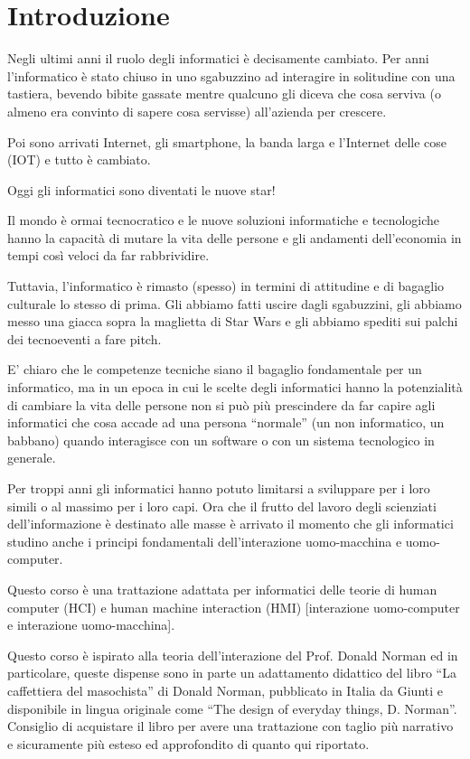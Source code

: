 \chapter{Introduzione}

Negli ultimi anni il ruolo degli informatici è decisamente cambiato. Per anni l'informatico è stato chiuso in uno sgabuzzino ad interagire in solitudine con una tastiera, bevendo bibite gassate mentre qualcuno gli diceva che cosa serviva (o almeno era convinto di sapere cosa servisse) all'azienda per crescere.

Poi sono arrivati Internet, gli smartphone, la banda larga e l'Internet delle cose (IOT) e tutto è cambiato. 

Oggi gli informatici sono diventati le nuove star! 

Il mondo è ormai tecnocratico e le nuove soluzioni informatiche e tecnologiche hanno la capacità di mutare la vita delle persone e gli andamenti dell'economia in tempi così veloci da far rabbrividire.

Tuttavia, l'informatico è rimasto (spesso) in termini di attitudine e di bagaglio culturale lo stesso di prima. Gli abbiamo fatti uscire dagli sgabuzzini, gli abbiamo messo una giacca sopra la maglietta di Star Wars e gli abbiamo spediti sui palchi dei tecnoeventi a fare pitch.

E' chiaro che le competenze tecniche siano il bagaglio fondamentale per un informatico, ma in un epoca in cui le scelte degli informatici hanno la potenzialità di cambiare la vita delle persone non si può più prescindere da far capire agli informatici che cosa accade ad una persona ``normale'' (un non informatico, un babbano) quando interagisce con un software o con un sistema tecnologico in generale. 

Per troppi anni gli informatici hanno potuto limitarsi a sviluppare per i loro simili o al massimo per i loro capi. Ora che il frutto del lavoro degli scienziati dell'informazione è destinato alle masse è arrivato il momento che gli informatici studino anche i principi fondamentali dell'interazione uomo-macchina e uomo-computer.

Questo corso è una trattazione adattata per informatici delle teorie di human computer (HCI) e human machine interaction (HMI) [interazione uomo-computer e interazione uomo-macchina]. 

Questo corso è ispirato alla teoria dell'interazione del Prof. Donald Norman ed in particolare, queste dispense sono in parte un adattamento didattico del libro ``La caffettiera del masochista'' di Donald Norman, pubblicato in Italia da Giunti e disponibile in lingua originale come ``The design of everyday things, D. Norman''. Consiglio di acquistare il libro per avere una trattazione con taglio più narrativo e sicuramente più esteso ed approfondito di quanto qui riportato.

